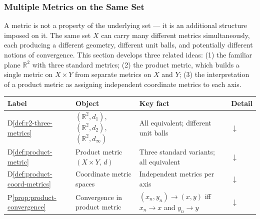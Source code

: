 \subsubsection{Multiple Metrics on the Same Set}
\label{sec:multiple-metrics}

A metric is not a property of the underlying set --- it is an additional
structure imposed on it.
The same set $X$ can carry many different metrics simultaneously, each
producing a different geometry, different unit balls, and potentially
different notions of convergence.
This section develops three related ideas:
(1) the familiar plane $\mathbb{R}^2$ with three standard metrics;
(2) the product metric, which builds a single metric on $X \times Y$ from
separate metrics on $X$ and $Y$;
(3) the interpretation of a product metric as assigning independent
coordinate metrics to each axis.

\begin{tcolorbox}[colback=gray!6, colframe=gray!40, arc=2pt,
  left=6pt, right=6pt, top=4pt, bottom=4pt,
  title={\small\textbf{Multiple Metrics --- Quick Reference}},
  fonttitle=\small\bfseries]
\small
\begin{tabular}{l l l l}
\toprule
\textbf{Label} & \textbf{Object} & \textbf{Key fact} & \textbf{Detail} \\
\midrule
D\ref{def:r2-three-metrics}
  & $(\mathbb{R}^2, d_1)$, $(\mathbb{R}^2, d_2)$, $(\mathbb{R}^2, d_\infty)$
  & All equivalent; different unit balls
  & \hyperref[def:r2-three-metrics]{$\downarrow$} \\
D\ref{def:product-metric}
  & Product metric $(X \times Y,\, d)$
  & Three standard variants; all equivalent
  & \hyperref[def:product-metric]{$\downarrow$} \\
D\ref{def:product-coord-metrics}
  & Coordinate metric spaces
  & Independent metrics per axis
  & \hyperref[def:product-coord-metrics]{$\downarrow$} \\
P\ref{prop:product-convergence}
  & Convergence in product metric
  & $(x_n,y_n)\to(x,y)$ iff $x_n\to x$ and $y_n\to y$
  & \hyperref[prop:product-convergence]{$\downarrow$} \\
\bottomrule
\end{tabular}
\end{tcolorbox}


